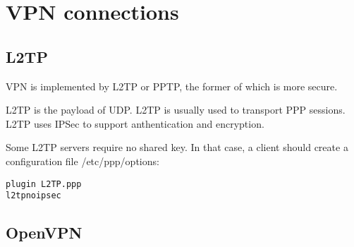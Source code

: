 \section{VPN connections}
\subsection{L2TP}
VPN is implemented by L2TP or PPTP, the former of which is more secure.

L2TP is the payload of UDP. L2TP is usually used to transport PPP sessions.
L2TP uses IPSec to support anthentication and encryption.


Some L2TP servers require no shared key. In that case, a client should create a
configuration file /etc/ppp/options:
\begin{verbatim}
plugin L2TP.ppp
l2tpnoipsec
\end{verbatim}

\subsection{OpenVPN}

